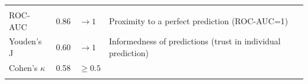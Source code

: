 \documentclass[11pt]{article}
\begin{document}
\begin{longtable}[]{@{}llll@{}}
\begin{minipage}[t]{0.49\columnwidth}
\strut
\end{minipage}\tabularnewline
\begin{minipage}[t]{0.21\columnwidth}\raggedright
ROC-AUC\strut
\end{minipage} & \begin{minipage}[t]{0.05\columnwidth}\raggedright
0.86\strut
\end{minipage} & \begin{minipage}[t]{0.13\columnwidth}\raggedright
\(\rightarrow 1\)\strut
\end{minipage} & \begin{minipage}[t]{0.49\columnwidth}\raggedright
Proximity to a perfect prediction (ROC-AUC=1)\strut
\end{minipage}\tabularnewline
\begin{minipage}[t]{0.21\columnwidth}\raggedright
Youden's J\strut
\end{minipage} & \begin{minipage}[t]{0.05\columnwidth}\raggedright
0.60\strut
\end{minipage} & \begin{minipage}[t]{0.13\columnwidth}\raggedright
\(\rightarrow 1\)\strut
\end{minipage} & \begin{minipage}[t]{0.49\columnwidth}\raggedright
Informedness of predictions (trust in individual prediction)\strut
\end{minipage}\tabularnewline
\begin{minipage}[t]{0.21\columnwidth}\raggedright
Cohen's \(\kappa\)\strut
\end{minipage} & \begin{minipage}[t]{0.05\columnwidth}\raggedright
0.58\strut
\end{minipage} & \begin{minipage}[t]{0.13\columnwidth}\raggedright
\(\ge 0.5\)\strut
\end{minipage} & \begin{minipage}[t]{0.49\columnwidth}\raggedright
\strut
\end{minipage}\tabularnewline
\begin{minipage}[t]{0.21\columnwidth}\raggedright
\strut
\end{minipage} & \begin{minipage}[t]{0.05\columnwidth}\raggedright
\strut
\end{minipage} & \begin{minipage}[t]{0.13\columnwidth}\raggedright
\strut
\end{minipage} & \begin{minipage}[t]{0.49\columnwidth}\raggedright

\end{minipage}
\end{longtable}
\end{document}
